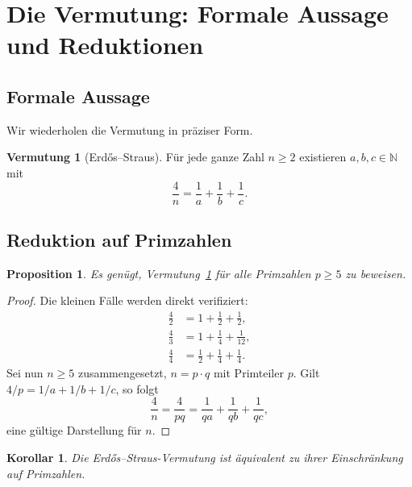 \documentclass[12pt,a4paper]{amsart}
\newtheorem{corollary}[theorem]{Korollar}
\newtheorem{proposition}[theorem]{Proposition}
\theoremstyle{definition}
\newtheorem{conjecture}[theorem]{Vermutung}
\newcommand{\N}{\mathbb{N}}
\begin{document}
\section{Die Vermutung: Formale Aussage und Reduktionen}

\subsection{Formale Aussage}

Wir wiederholen die Vermutung in präziser Form.

\begin{conjecture}[Erd\H{o}s--Straus]\label{verm:ES2}
Für jede ganze Zahl $n \geq 2$ existieren $a, b, c \in \N$ mit
\begin{equation}\label{gl:ES}
  \frac{4}{n} = \frac{1}{a} + \frac{1}{b} + \frac{1}{c}.
\end{equation}
\end{conjecture}

\subsection{Reduktion auf Primzahlen}

\begin{proposition}\label{prop:primreduktion}
Es genügt, Vermutung~\ref{verm:ES2} für alle Primzahlen $p \geq 5$
zu beweisen.
\end{proposition}

\begin{proof}
Die kleinen Fälle werden direkt verifiziert:
\begin{align*}
  \frac{4}{2} &= 1 + \frac{1}{2} + \frac{1}{2}, \\
  \frac{4}{3} &= 1 + \frac{1}{4} + \frac{1}{12}, \\
  \frac{4}{4} &= \frac{1}{2} + \frac{1}{4} + \frac{1}{4}.
\end{align*}
Sei nun $n \geq 5$ zusammengesetzt, $n = p \cdot q$ mit Primteiler $p$.
Gilt $4/p = 1/a + 1/b + 1/c$, so folgt
\[
  \frac{4}{n} = \frac{4}{pq} = \frac{1}{qa} + \frac{1}{qb} + \frac{1}{qc},
\]
eine gültige Darstellung für $n$.
\end{proof}

\begin{corollary}
Die Erd\H{o}s--Straus-Vermutung ist äquivalent zu ihrer Einschränkung auf
Primzahlen.
\end{corollary}
\end{document}

